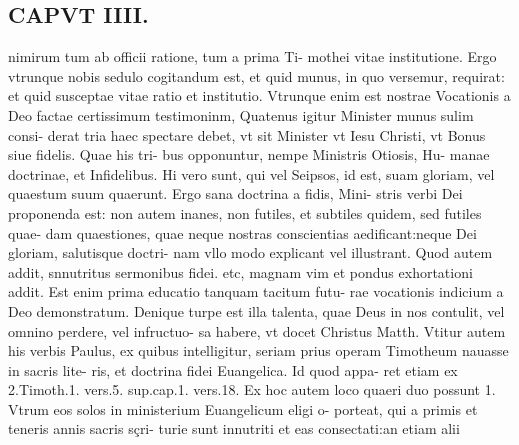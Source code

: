 \documentclass{article}
\begin{document}
\begin{pages}
\section*{CAPVT  IIII. }
\marginpar{[ p.201 ]}\pstart nimirum tum ab officii ratione, tum a prima Ti- mothei vitae institutione. Ergo vtrunque nobis sedulo cogitandum est, et quid munus, in quo versemur, requirat: et quid susceptae vitae ratio et institutio. Vtrunque enim est nostrae Vocationis a Deo factae certissimum testimoninm,  \pend\pstart Quatenus igitur Minister munus sulim consi- derat tria haec spectare debet, vt sit Minister vt Iesu Christi, vt Bonus siue fidelis. Quae his tri- bus opponuntur, nempe Ministris Otiosis, Hu- manae doctrinae, et Infidelibus. Hi vero sunt, qui vel Seipsos, id est, suam gloriam, vel quaestum suum quaerunt. Ergo sana doctrina a fidis, Mini- stris verbi Dei proponenda est: non autem inanes, non futiles, et subtiles quidem, sed futiles quae- dam quaestiones, quae neque nostras conscientias aedificant:neque Dei gloriam, salutisque doctri- nam vllo modo explicant vel illustrant.  \pend\pstart Quod autem addit, snnutritus sermonibus fidei. etc, magnam vim et pondus exhortationi addit. Est enim prima educatio tanquam tacitum futu- rae vocationis indicium a Deo demonstratum.  \pend\pstart Denique turpe est illa talenta, quae Deus in nos contulit, vel omnino perdere, vel infructuo- sa habere, vt docet Christus Matth. Vtitur autem his verbis Paulus, ex quibus intelligitur, seriam prius operam Timotheum nauasse in sacris lite- ris, et doctrina fidei Euangelica. Id quod appa- ret etiam ex 2.Timoth.1. vers.5. sup.cap.1. vers.18. Ex hoc autem loco quaeri duo possunt 1. Vtrum eos solos in ministerium Euangelicum eligi o- porteat, qui a primis et teneris annis sacris sçri- turie sunt innutriti et eas consectati:an etiam alii  \pend

\end{pages}
\end{document}
